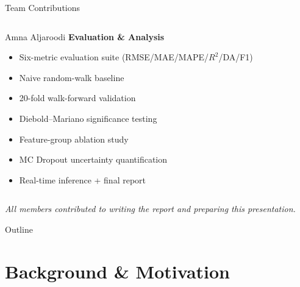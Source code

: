 \documentclass[aspectratio=169]{beamer}
\begin{document}
\begin{frame}{Team Contributions}
\begin{columns}[T,onlytextwidth]
\begin{block}{\color{white}Amna Aljaroodi}
\textbf{Evaluation \& Analysis}
\begin{itemize}\scriptsize
  \item Six-metric evaluation suite (RMSE/MAE/MAPE/$R^2$/DA/F1)
  \item Naive random-walk baseline
  \item 20-fold walk-forward validation
  \item Diebold--Mariano significance testing
  \item Feature-group ablation study
  \item MC Dropout uncertainty quantification
  \item Real-time inference + final report
\end{itemize}
\end{block}

\end{columns}

\vspace{0.4cm}
\centering
\footnotesize\textit{All members contributed to writing the report and preparing this presentation.}
\end{frame}

\begin{frame}{Outline}
\tableofcontents
\end{frame}


\section{Background \& Motivation}
\end{document}
